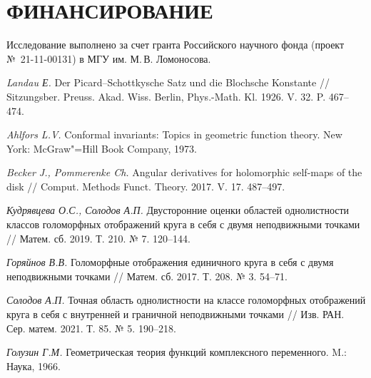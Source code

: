 \documentclass{article}
\theoremstyle{definition}
\theoremstyle{plain}
\begin{document}
\section*{ФИНАНСИРОВАНИЕ}

Исследование выполнено за счет гранта Российского научного фонда (проект №~21-11-00131) в МГУ им. М.\,В. Ломоносова.


\begin{thebibliography}{99}
\textit{Landau Е.}
Der Picard--Schottkysche Satz und die Blochsche Konstante //
Sitzungsber. Preuss. Akad. Wiss. Berlin, Phys.-Math. Kl. 1926. V. 32. P. 467--474.

\textit{Ahlfors L.V.}
Conformal invariants: Topics in geometric
	function theory. New York: McGraw"=Hill Book Company, 1973. 	

\textit{Becker J., Pommerenke Ch.}
Angular derivatives for holomorphic self-maps of the disk //
Comput. Methods Funct. Theory. 2017.
V. 17. 487--497.

\textit{Кудрявцева О.С., Солодов А.П.}
Двусторонние оценки областей однолистности классов голоморфных отображений круга в себя с двумя неподвижными точками //
Матем. сб. 2019. Т. 210. № 7. 120--144.

\textit{Горяйнов В.В.}
Голоморфные отображения единичного круга в себя с двумя неподвижными точками //
Матем. сб. 2017.
Т. 208. № 3. 54--71.

\textit{Солодов А.П.}
 Точная область однолистности на классе голоморфных отображений круга в себя с внутренней и граничной неподвижными точками //
Изв. РАН. Сер. матем. 2021. Т. 85. № 5. 190--218.

\textit{Голузин Г.М.}
Геометрическая теория функций комплексного переменного. M.:
Наука, 1966.

\end{thebibliography}

\renewcommand\refname{References}
\end{document}
